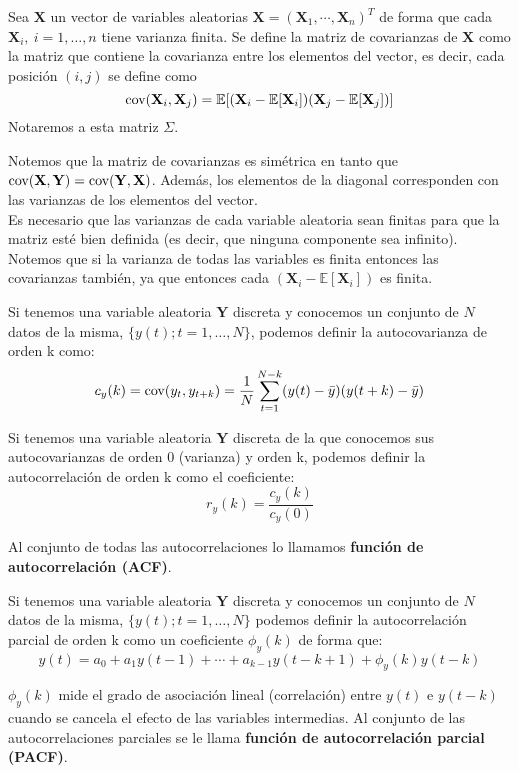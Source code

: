 \begin{definicion}
	Sea $\mathbf{X}$ un vector de variables aleatorias $\mathbf{X}=(\mathbf{X}_1, \cdots, \mathbf{X}_n)^T$ de forma que cada $\mathbf{X}_i,\ i=1, \dots, n$ tiene varianza finita. Se define la matriz de covarianzas de $\mathbf{X}$ como la matriz que contiene la covarianza entre los elementos del vector, es decir, cada posición $(i,j)$ se define como 
	\[ \text{cov}{(\mathbf{X}_i, \mathbf{X}_j)} = \mathbb{E}[(\mathbf{X}_i - \mathbb{E}[\mathbf{X}_i])(\mathbf{X}_j - \mathbb{E}[\mathbf{X}_j])]	\]
	Notaremos a esta matriz $\Sigma$.
\end{definicion}

Notemos que la matriz de covarianzas es simétrica en tanto que $\text{cov}{(\mathbf{X}, \mathbf{Y})} = \text{cov}{(\mathbf{Y}, \mathbf{X})}$. Además, los elementos de la diagonal corresponden con las varianzas de los elementos del vector.\\

Es necesario que las varianzas de cada variable aleatoria sean finitas para que la matriz esté bien definida (es decir, que ninguna componente sea infinito). Notemos que si la varianza de todas las variables es finita entonces las covarianzas también, ya que entonces cada $(\mathbf{X}_i - \mathbb{E}[\mathbf{X}_i])$ es finita.

\begin{definicion}
Si tenemos una variable aleatoria $\mathbf{Y}$ discreta y conocemos un conjunto de $N$ datos de la misma, $\{y(t); t=1,\dots,N\}$, podemos definir la autocovarianza de orden k como:
\[	c_y(k) = \text{cov}{(y_t, y_{t+k})} = \frac{1}{N} \sum_{t=1}^{N-k}(y(t)-\bar{y})(y(t+k)-\bar{y})	\]
\end{definicion}

\begin{definicion}
Si tenemos una variable aleatoria $\mathbf{Y}$ discreta de la que conocemos sus autocovarianzas de orden 0 (varianza) y orden k, podemos definir la autocorrelación de orden k como el coeficiente:
\[	r_y(k) = \frac{c_y(k)}{c_y(0)}	\]

Al conjunto de todas las autocorrelaciones lo llamamos \textbf{función de autocorrelación (ACF)}.
\end{definicion}

\begin{definicion}
Si tenemos una variable aleatoria $\mathbf{Y}$ discreta y conocemos un conjunto de $N$ datos de la misma, $\{y(t); t=1,\dots,N\}$ podemos definir la autocorrelación parcial de orden k como un coeficiente $\phi_y(k)$ de forma que:
\[	y(t) = a_0 + a_1y(t-1)+\cdots + a_{k-1}y(t-k+1) + \phi_y(k)y(t-k)	\]

$\phi_y(k)$ mide el grado de asociación lineal (correlación) entre $y(t)$ e $y(t-k)$ cuando se cancela el efecto de las variables intermedias. Al conjunto de las autocorrelaciones parciales se le llama \textbf{función de autocorrelación parcial (PACF)}.
\end{definicion}

